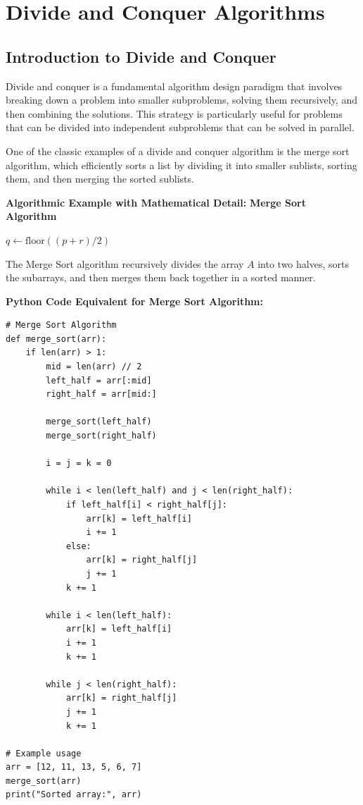 \documentclass[12pt]{book} %
\begin{document}
\chapter{Divide and Conquer Algorithms}

\section{Introduction to Divide and Conquer}
Divide and conquer is a fundamental algorithm design paradigm that involves breaking down a problem into smaller subproblems, solving them recursively, and then combining the solutions. This strategy is particularly useful for problems that can be divided into independent subproblems that can be solved in parallel.

One of the classic examples of a divide and conquer algorithm is the merge sort algorithm, which efficiently sorts a list by dividing it into smaller sublists, sorting them, and then merging the sorted sublists.

\textbf{Algorithmic Example with Mathematical Detail:}
\FloatBarrier
\textbf{Merge Sort Algorithm}
\FloatBarrier
\begin{algorithm}
\caption{Merge Sort}\label{merge_sort}
\begin{algorithmic}[1]
        \State $q \gets \text{floor}((p+r)/2)$
        \State {}
        \State {}
        \State {}
    \EndIf
\EndFunction
\end{algorithmic}
\end{algorithm}
\FloatBarrier
The Merge Sort algorithm recursively divides the array $A$ into two halves, sorts the subarrays, and then merges them back together in a sorted manner.

\textbf{Python Code Equivalent for Merge Sort Algorithm:}
\FloatBarrier
\begin{lstlisting}
# Merge Sort Algorithm
def merge_sort(arr):
    if len(arr) > 1:
        mid = len(arr) // 2
        left_half = arr[:mid]
        right_half = arr[mid:]

        merge_sort(left_half)
        merge_sort(right_half)

        i = j = k = 0

        while i < len(left_half) and j < len(right_half):
            if left_half[i] < right_half[j]:
                arr[k] = left_half[i]
                i += 1
            else:
                arr[k] = right_half[j]
                j += 1
            k += 1

        while i < len(left_half):
            arr[k] = left_half[i]
            i += 1
            k += 1

        while j < len(right_half):
            arr[k] = right_half[j]
            j += 1
            k += 1

# Example usage
arr = [12, 11, 13, 5, 6, 7]
merge_sort(arr)
print("Sorted array:", arr)
\end{lstlisting}
\FloatBarrier
\end{document}
